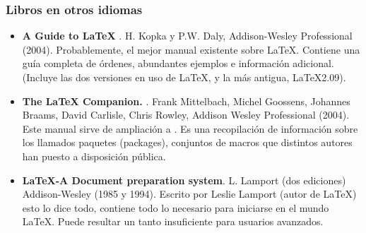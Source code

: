 						\subsubsection{Libros en otros idiomas}
									
								\begin{itemize}
											\item \textbf{A Guide to \LaTeX{}} \cite{aguide}. H. Kopka y P.W. Daly, Addison-Wesley 
											Professional (2004).
											Probablemente, el mejor manual existente sobre \LaTeX{}. Contiene una gu\'ia completa de 
											\'ordenes, abundantes ejemplos e informaci\'on adicional. (Incluye las dos versiones en uso 
											de \LaTeX{}, \LaTeXe{} y la m\'as antigua, \LaTeX{}2.09).
											
											\item \textbf{The \LaTeX{} Companion.} \cite{latexcomp}. Frank Mittelbach, Michel Goossens, 
											Johannes Braams, David Carlisle, Chris Rowley, Addison Wesley Professional (2004).
											Este manual sirve de ampliaci\'on a \cite{aguide}. Es una recopilaci\'on de informaci\'on 
											sobre los llamados paquetes (packages), conjuntos de macros que distintos autores han puesto 
											a disposici\'on p\'ublica.
 
											\item \textbf{\LaTeX{}-A Document preparation system}\cite{adocument}. L. Lamport (dos ediciones) 
														Addison-Wesley (1985 y 1994).
														Escrito por Leslie Lamport (autor de \LaTeX{}) esto lo dice todo, contiene todo lo 
														necesario para iniciarse en el mundo \LaTeX{}. Puede resultar un tanto insuficiente para
														usuarios avanzados. 
														
								\end{itemize}
		
